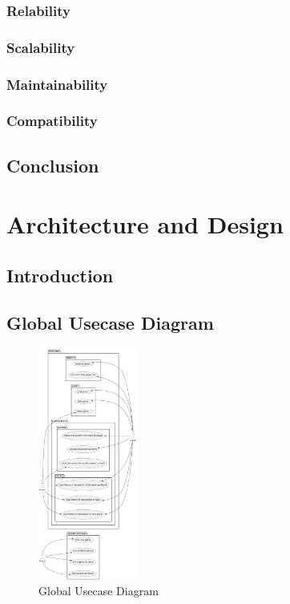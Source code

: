 \documentclass{article}
\begin{document}
\subsubsection{Relability}
\subsubsection{Scalability}
\subsubsection{Maintainability}
\subsubsection{Compatibility}

\subsection{Conclusion}

\section{Architecture and Design}

\subsection{Introduction}

\subsection{Global Usecase Diagram}
 \begin{figure}[H]
	 \centering
	 \includegraphics[height=3in]{../thesis_tex/assets/diagrams/global_ucd.png}
	 \caption{Global Usecase Diagram}
\end{figure}
\end{document}
